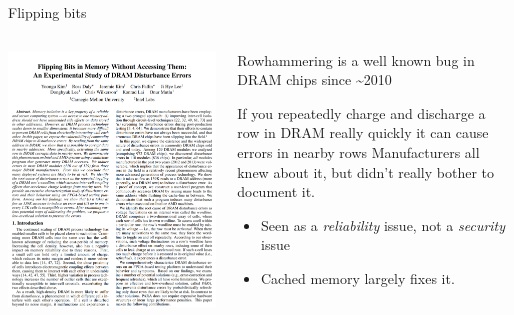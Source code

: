 \documentclass[9pt,aspectratio=169]{beamer}
\begin{document}
\begin{frame}[label={sec:org441a6ba}]{Flipping bits}
\begin{columns}
\begin{column}[t]{0.49\columnwidth}
\begin{center}
\includegraphics[width=\linewidth]{./flippingbits.png}
\end{center}
\end{column}

\begin{column}[t]{0.49\columnwidth}
Rowhammering is a well known bug in DRAM chips since \textasciitilde{}2010

\begin{block}{If you repeatedly charge and discharge a row in DRAM really quickly it can cause errors in nearby rows}
Manufacturers all knew about it, but didn't really bother to document it.
\begin{itemize}
\item Seen as a \emph{reliability} issue, not a \emph{security} issue
\item Cached memory largely fixes it.
\end{itemize}


\end{block}
\end{column}
\end{columns}
\end{frame}
\end{document}
